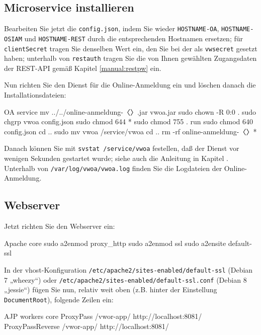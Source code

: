 \subsection{Microservice installieren}\label{subsec:setup-oa-svc}

Bearbeiten Sie jetzt die \texttt{config.json}, indem Sie wieder
\texttt{HOSTNAME-OA},
\texttt{HOSTNAME-OSIAM} und \texttt{HOSTNAME-REST} durch die
entsprechenden Hostnamen ersetzen; für \texttt{clientSecret}
tragen Sie denselben Wert ein, den Sie bei der
 als \texttt{vwsecret}
gesetzt haben; unterhalb von \texttt{restauth} tragen Sie die
von Ihnen gewählten Zugangsdaten der REST-API gemäß Kapitel
\ref{manual:restpw} ein.

\begin{minipage}{\textwidth}
Nun richten Sie den Dienst für die Online-Anmeldung ein und
löschen danach die Installationsdateien:

\begin{lstdump}{OA service}
mv ../../online-anmeldung-〈\lstdumpesc{\vwiaverssw}〉.jar vwoa.jar
sudo chown -R 0:0 .
sudo chgrp vwoa config.json
sudo chmod 644 *
sudo chmod 755 . run
sudo chmod 640 config.json
cd ..
sudo mv vwoa /service/vwoa
cd ..
rm -rf online-anmeldung-〈\lstdumpesc{\vwiaverssw}〉*
\end{lstdump}
\end{minipage}

Danach können Sie mit \texttt{svstat /service/vwoa} festellen,
daß der Dienst vor wenigen Sekunden gestartet wurde; siehe
auch die Anleitung in Kapitel .
Unterhalb von \texttt{/var/log/vwoa/vwoa.log} finden Sie die
Logdateien der Online-Anmeldung.

\subsection{Webserver}\label{subsec:setup-oa-apache}

\begin{minipage}{\textwidth}
Jetzt richten Sie den Webserver ein:

\begin{lstdump}{Apache core}
sudo a2enmod proxy_http
sudo a2enmod ssl
sudo a2ensite default-ssl
\end{lstdump}
\end{minipage}

\begin{minipage}{\textwidth}
In der vhost-Konfiguration \texttt{/etc/apache2/sites-enabled/default-ssl}
(Debian 7 „wheezy“) oder \texttt{/etc/apache2/sites-enabled/default-ssl.conf}
(Debian 8 „jessie“) fügen Sie nun, relativ weit oben (z.B. hinter der Einstellung
\texttt{DocumentRoot}), folgende Zeilen ein:

\begin{lstdump}{AJP workers core}
ProxyPass /vwor-app/ http://localhost:8081/
ProxyPassReverse /vwor-app/ http://localhost:8081/
\end{lstdump}
\end{minipage}

